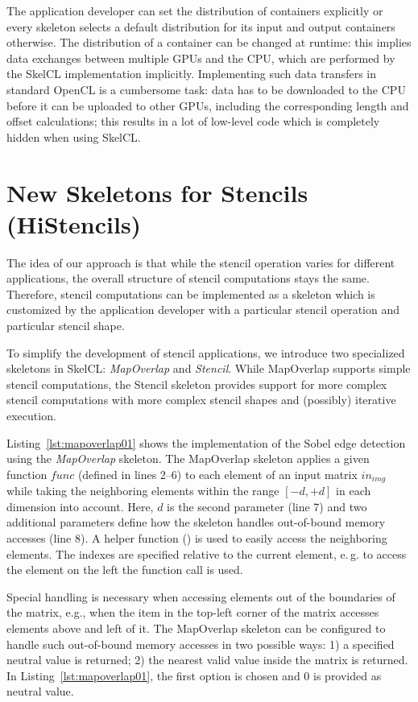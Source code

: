 The application developer can set the distribution of containers explicitly or every skeleton selects a default distribution for its input and output containers otherwise.
The distribution of a container can be changed at runtime:
this implies data exchanges between multiple GPUs and the CPU, which are performed by the SkelCL implementation implicitly.
Implementing such data transfers in standard OpenCL is a cumbersome task:
data has to be downloaded to the CPU before it can be uploaded to other GPUs, including the corresponding length and offset calculations;
this results in a lot of low-level code which is completely hidden when using SkelCL.

\section{New Skeletons for Stencils (HiStencils)}
\label{sec:stencil}

The idea of our approach is that while the stencil operation varies for different applications, the overall structure of stencil computations stays the same.
Therefore, stencil computations can be implemented as a skeleton which is customized by the application developer with a particular stencil operation and particular stencil shape.

To simplify the development of stencil applications, we introduce two specialized skeletons in SkelCL: \emph{MapOverlap} and \emph{Stencil}.
While MapOverlap supports simple stencil computations, the Stencil skeleton provides support for more complex stencil computations with more complex stencil shapes and (possibly) iterative execution.

Listing~\ref{lst:mapoverlap01} shows the implementation of the Sobel edge detection using the \emph{MapOverlap} skeleton.
The MapOverlap skeleton applies a given function $func$ (defined in lines 2--6) to each element of an input matrix $in_{img}$ while taking the neighboring elements within the range $[-d, +d]$ in each dimension into account.
Here, $d$ is the second parameter (line 7) and two additional parameters define how the skeleton handles out-of-bound memory accesses (line 8).
A helper function () is used to easily access the neighboring elements.
The indexes are specified relative to the current element, e.\,g. to access the element on the left the function call  is used.

Special handling is necessary when accessing elements out of the boundaries of the matrix, e.g., when the item in the top-left corner of the matrix accesses elements above and left of it.
The MapOverlap skeleton can be configured to handle such out-of-bound memory accesses in two possible ways:
1) a specified neutral value is returned;
2) the nearest valid value inside the matrix is returned.
In Listing~\ref{lst:mapoverlap01}, the first option is chosen and $0$ is provided as neutral value.

